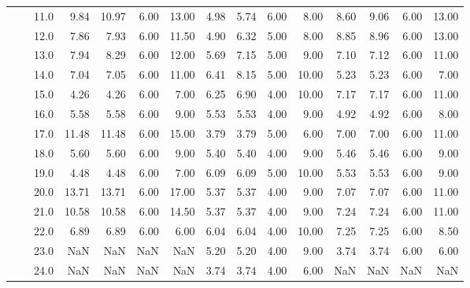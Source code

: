 \begin{tabular}{lllrrrrrrrrrrrr}
        &     & 11.0 &       9.84 &     10.97 & 6.00 &  13.00 &       4.98 &      5.74 & 6.00 &   8.00 &       8.60 &      9.06 & 6.00 &  13.00 \\
        &     & 12.0 &       7.86 &      7.93 & 6.00 &  11.50 &       4.90 &      6.32 & 5.00 &   8.00 &       8.85 &      8.96 & 6.00 &  13.00 \\
        &     & 13.0 &       7.94 &      8.29 & 6.00 &  12.00 &       5.69 &      7.15 & 5.00 &   9.00 &       7.10 &      7.12 & 6.00 &  11.00 \\
        &     & 14.0 &       7.04 &      7.05 & 6.00 &  11.00 &       6.41 &      8.15 & 5.00 &  10.00 &       5.23 &      5.23 & 6.00 &   7.00 \\
        &     & 15.0 &       4.26 &      4.26 & 6.00 &   7.00 &       6.25 &      6.90 & 4.00 &  10.00 &       7.17 &      7.17 & 6.00 &  11.00 \\
        &     & 16.0 &       5.58 &      5.58 & 6.00 &   9.00 &       5.53 &      5.53 & 4.00 &   9.00 &       4.92 &      4.92 & 6.00 &   8.00 \\
        &     & 17.0 &      11.48 &     11.48 & 6.00 &  15.00 &       3.79 &      3.79 & 5.00 &   6.00 &       7.00 &      7.00 & 6.00 &  11.00 \\
        &     & 18.0 &       5.60 &      5.60 & 6.00 &   9.00 &       5.40 &      5.40 & 4.00 &   9.00 &       5.46 &      5.46 & 6.00 &   9.00 \\
        &     & 19.0 &       4.48 &      4.48 & 6.00 &   7.00 &       6.09 &      6.09 & 5.00 &  10.00 &       5.53 &      5.53 & 6.00 &   9.00 \\
        &     & 20.0 &      13.71 &     13.71 & 6.00 &  17.00 &       5.37 &      5.37 & 4.00 &   9.00 &       7.07 &      7.07 & 6.00 &  11.00 \\
        &     & 21.0 &      10.58 &     10.58 & 6.00 &  14.50 &       5.37 &      5.37 & 4.00 &   9.00 &       7.24 &      7.24 & 6.00 &  11.00 \\
        &     & 22.0 &       6.89 &      6.89 & 6.00 &   6.00 &       6.04 &      6.04 & 4.00 &  10.00 &       7.25 &      7.25 & 6.00 &   8.50 \\
        &     & 23.0 &        NaN &       NaN &  NaN &    NaN &       5.20 &      5.20 & 4.00 &   9.00 &       3.74 &      3.74 & 6.00 &   6.00 \\
        &     & 24.0 &        NaN &       NaN &  NaN &    NaN &       3.74 &      3.74 & 4.00 &   6.00 &        NaN &       NaN &  NaN &    NaN \\

\end{tabular}
